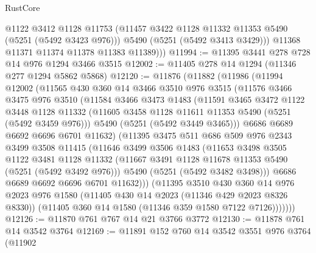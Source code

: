 \begin{lexlean}{RustCore}
\begin{coremodule}
            @1122
            @3412
            @1128
            @11753
            (@11457 @3422 @1128 @11332 @11353 @5490 (@5251 (@5492 @3423 @976)))
            @5490
            (@5251 (@5492 @3413 @3429)))
          @11368
          @11371
          @11374
          @11378
          @11383
          @11389)))
@11994 := @11395 @3441 @278 @728 @14 @976 @1294 @3466 @3515
@12002 := @11405 @278 @14 @1294 (@11346 @277 @1294 @5862 @5868)
@12120 := @11876
    (@11882
      (@11986
        (@11994
          @12002
          (@11565
            @430
            @360
            @14
            @3466
            @3510
            @976
            @3515
            (@11576
              @3466
              @3475
              @976
              @3510
              (@11584
                @3466
                @3473
                @1483
                (@11591
                  @3465
                  @3472
                  @1122
                  @3448
                  @1128
                  @11332
                  (@11605 @3458 @1128 @11611 @11353 @5490 (@5251 (@5492 @3459 @976)))
                  @5490
                  (@5251 (@5492 @3449 @3465)))
                @6686
                @6689
                @6692
                @6696
                @6701
                @11632)
              (@11395
                @3475
                @511
                @686
                @509
                @976
                @2343
                @3499
                @3508
                @11415
                (@11646
                  @3499
                  @3506
                  @1483
                  (@11653
                    @3498
                    @3505
                    @1122
                    @3481
                    @1128
                    @11332
                    (@11667 @3491 @1128 @11678 @11353 @5490 (@5251 (@5492 @3492 @976)))
                    @5490
                    (@5251 (@5492 @3482 @3498)))
                  @6686
                  @6689
                  @6692
                  @6696
                  @6701
                  @11632)))
            (@11395
              @3510
              @430
              @360
              @14
              @976
              @2023
              @976
              @1580
              (@11405 @430 @14 @2023 (@11346 @429 @2023 @8326 @8330))
              (@11405 @360 @14 @1580 (@11346 @359 @1580 @7122 @7126)))))))
@12126 := @11870 @761 @767 @14 @21 @3766 @3772
@12130 := @11878 @761 @14 @3542 @3764
@12169 := @11891
    @152
    @760
    @14
    @3542
    @3551
    @976
    @3764
    (@11902

\end{coremodule}
\end{lexlean}
